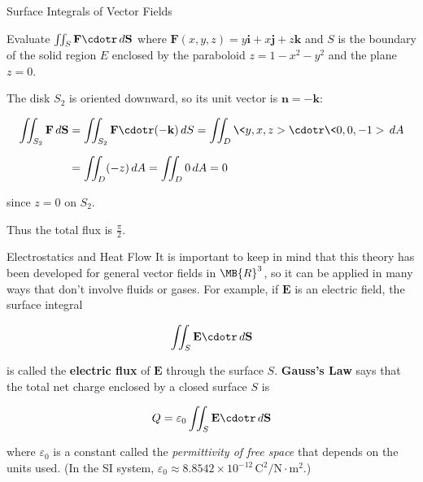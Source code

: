 \documentclass[11pt,english,
handout
]{beamer}
\begin{document}
\begin{frame}[t]{Surface Integrals of Vector Fields}
\small
\begin{example}
Evaluate $\iint_S\mathbf{F}\cdotr\,d\mathbf{S}$ where $\mathbf{F}(x,y,z)=y\mathbf{i}+x\mathbf{j}+z\mathbf{k}$ and $S$ is the boundary of the solid region $E$ enclosed by the paraboloid $z=1-x^2-y^2$ and the plane $z=0$.

\lspace
The disk $S_2$ is oriented downward, so its unit vector is $\mathbf{n}=-\mathbf{k}$:

\begin{align*}
\iint_{S_2}\mathbf{F}\,d\mathbf{S}&=\iint_{S_2}\mathbf{F}\cdotr(-\mathbf{k})\,dS=\iint_D\<y,x,z>\cdotr\<0,0,-1>\,dA\\[2mm]
&=\iint_D(-z)\,dA=\iint_D0\,dA=0
\end{align*}\pause

since $z=0$ on $S_2$.

\lspace
Thus the total flux is $\frac{\pi}{2}$.
\end{example}
\end{frame}















\begin{frame}{Electrostatics and Heat Flow}
\small
It is important to keep in mind that this theory has been developed for general vector fields in $\MB{R}^3$, so it can be applied in many ways that don't involve fluids or gases. \pause For example, if $\mathbf{E}$ is an electric field, the surface integral

\[
\iint_S\mathbf{E}\cdotr\,d\mathbf{S}
\]

is called the \textbf{electric flux} of $\mathbf{E}$ through the surface $S$. \pause \textbf{Gauss's Law} says that the total net charge enclosed by a closed surface $S$ is 

\[
Q=\varepsilon_0\iint_S\mathbf{E}\cdotr\,d\mathbf{S}
\]

where $\varepsilon_0$ is a constant called the \textit{permittivity of free space} that depends on the units used. (In the SI system, $\varepsilon_0\approx8.8542\times10^{-12}\,\text{C}^2/\text{N$\cdot$m$^2$}$.)
\end{frame}
\end{document}
